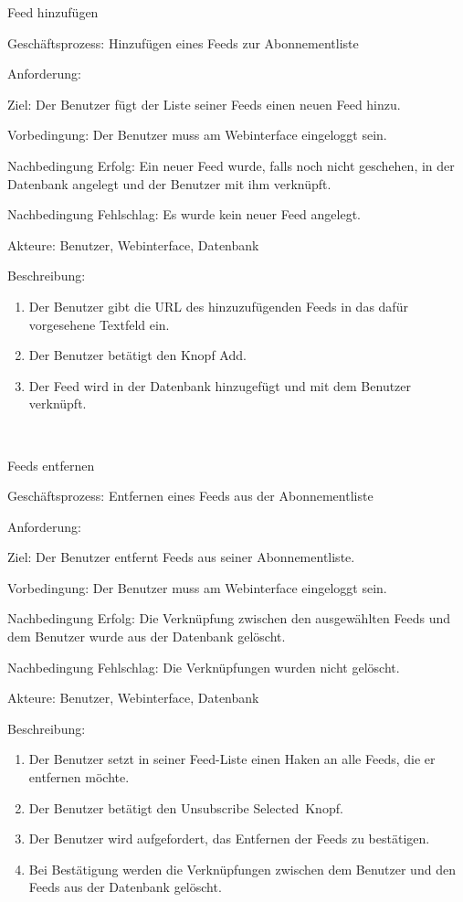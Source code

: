 \begin{function}{71}{Feed hinzufügen}
\item[Geschäftsprozess:] Hinzufügen eines Feeds zur Abonnementliste
\item[Anforderung:] 
\item[Ziel:] Der Benutzer fügt der Liste seiner Feeds einen neuen Feed hinzu.
\item[Vorbedingung:] Der Benutzer muss am Webinterface eingeloggt sein.
\item[Nachbedingung Erfolg:] Ein neuer Feed wurde, falls noch nicht geschehen, in der Datenbank angelegt und der Benutzer mit ihm verknüpft.
\item[Nachbedingung Fehlschlag:] Es wurde kein neuer Feed angelegt.
\item[Akteure:] Benutzer, Webinterface, Datenbank
\item[Beschreibung:] ~
\begin{enumerate}
\item Der Benutzer gibt die URL des hinzuzufügenden Feeds in das dafür vorgesehene Textfeld ein.
\item Der Benutzer betätigt den Knopf \glqq Add\grqq.
\item Der Feed wird in der Datenbank hinzugefügt und mit dem Benutzer verknüpft.
\end{enumerate}
\end{function} ~

\begin{function}{72}{Feeds entfernen}
\item[Geschäftsprozess:] Entfernen eines Feeds aus der Abonnementliste
\item[Anforderung:] 
\item[Ziel:] Der Benutzer entfernt Feeds aus seiner Abonnementliste.
\item[Vorbedingung:] Der Benutzer muss am Webinterface eingeloggt sein.
\item[Nachbedingung Erfolg:] Die Verknüpfung zwischen den ausgewählten Feeds und dem Benutzer wurde aus der Datenbank gelöscht.
\item[Nachbedingung Fehlschlag:] Die Verknüpfungen wurden nicht gelöscht.
\item[Akteure:] Benutzer, Webinterface, Datenbank
\item[Beschreibung:] ~
\begin{enumerate}
\item Der Benutzer setzt in seiner Feed-Liste einen Haken an alle Feeds, die er entfernen möchte.
\item Der Benutzer betätigt den \glqq Unsubscribe Selected\grqq\ Knopf.
\item Der Benutzer wird aufgefordert, das Entfernen der Feeds zu bestätigen.
\item Bei Bestätigung werden die Verknüpfungen zwischen dem Benutzer und den Feeds aus der Datenbank gelöscht.
\end{enumerate}
\end{function} ~


